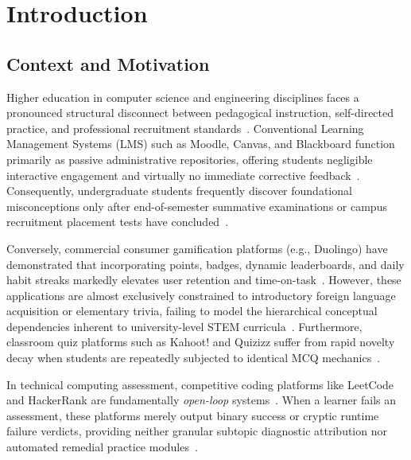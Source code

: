 \documentclass[journal]{IEEEtran}
\begin{document}
\section{Introduction}
\subsection{Context and Motivation}
Higher education in computer science and engineering disciplines faces a pronounced structural disconnect between pedagogical instruction, self-directed practice, and professional recruitment standards~\cite{khaldi2023}. Conventional Learning Management Systems (LMS) such as Moodle, Canvas, and Blackboard function primarily as passive administrative repositories, offering students negligible interactive engagement and virtually no immediate corrective feedback~\cite{mavrikis2024}. Consequently, undergraduate students frequently discover foundational misconceptions only after end-of-semester summative examinations or campus recruitment placement tests have concluded~\cite{kumar2023}.

Conversely, commercial consumer gamification platforms (e.g., Duolingo) have demonstrated that incorporating points, badges, dynamic leaderboards, and daily habit streaks markedly elevates user retention and time-on-task~\cite{bayati2024, sailer2020}. However, these applications are almost exclusively constrained to introductory foreign language acquisition or elementary trivia, failing to model the hierarchical conceptual dependencies inherent to university-level STEM curricula~\cite{gao2024}. Furthermore, classroom quiz platforms such as Kahoot! and Quizizz suffer from rapid novelty decay when students are repeatedly subjected to identical MCQ mechanics~\cite{wang2020, nurdin2023}.

In technical computing assessment, competitive coding platforms like LeetCode and HackerRank are fundamentally \emph{open-loop} systems~\cite{mavrikis2024}. When a learner fails an assessment, these platforms merely output binary success or cryptic runtime failure verdicts, providing neither granular subtopic diagnostic attribution nor automated remedial practice modules~\cite{li2024}.
\end{document}
